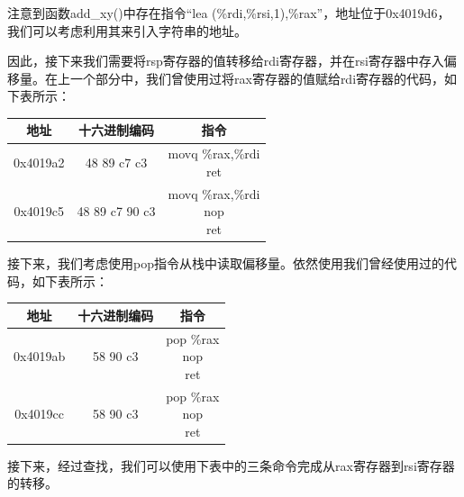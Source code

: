 \documentclass{article}
\begin{document}
注意到函数add\_xy()中存在指令“lea (\%rdi,\%rsi,1),\%rax”，地址位于0x4019d6，我们可以考虑利用其来引入字符串的地址。

因此，接下来我们需要将rsp寄存器的值转移给rdi寄存器，并在rsi寄存器中存入偏移量。在上一个部分中，我们曾使用过将rax寄存器的值赋给rdi寄存器的代码，如下表所示：
\begin{table}[H]
  \begin{center}
    \begin{tabular}{|c|c|c|}
      \hline
      地址     & 十六进制编码   & 指令                       \\
      \hline
      0x4019a2 & 48 89 c7 c3    & \thead[l]{movq \%rax,\%rdi \\ ret} \\
      \hline
      0x4019c5 & 48 89 c7 90 c3 & \thead[l]{movq \%rax,\%rdi \\ nop \\ ret} \\
      \hline
    \end{tabular}
  \end{center}
\end{table}

接下来，我们考虑使用pop指令从栈中读取偏移量。依然使用我们曾经使用过的代码，如下表所示：

\begin{table}[H]
  \begin{center}
    \begin{tabular}{|c|c|c|}
      \hline
      地址     & 十六进制编码 & 指令                \\
      \hline
      0x4019ab & 58 90 c3     & \thead[l]{pop \%rax \\ nop \\ ret} \\
      \hline
      0x4019cc & 58 90 c3     & \thead[l]{pop \%rax \\ nop \\ ret} \\
      \hline
    \end{tabular}
  \end{center}
\end{table}

接下来，经过查找，我们可以使用下表中的三条命令完成从rax寄存器到rsi寄存器的转移。
\end{document}
